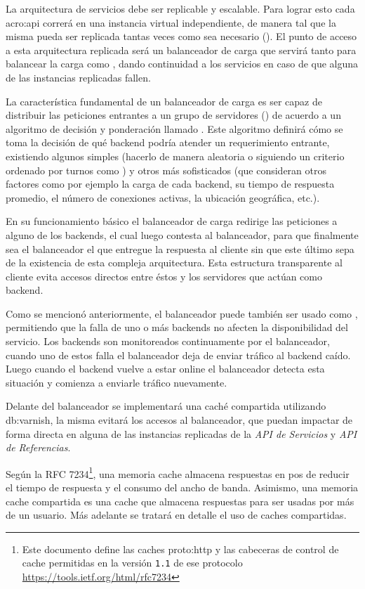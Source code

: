 La arquitectura de servicios debe ser replicable y escalable. Para lograr esto cada \gls{acro:api} correrá en una instancia virtual independiente, de manera tal que la misma pueda ser replicada tantas veces como sea necesario (). El punto de acceso a esta arquitectura replicada será un balanceador de carga que servirá tanto para balancear la carga como , dando continuidad a los servicios en caso de que alguna de las instancias replicadas fallen.

La característica fundamental de un balanceador de carga es ser capaz de distribuir las peticiones entrantes a un grupo de servidores () de acuerdo a un algoritmo de decisión y ponderación llamado . Este algoritmo definirá cómo se toma la decisión de qué backend podría atender un requerimiento entrante, existiendo algunos simples (hacerlo de manera aleatoria o siguiendo un criterio ordenado por turnos como ) y otros más sofisticados (que consideran otros factores como por ejemplo la carga de cada backend, su tiempo de respuesta promedio, el número de conexiones activas, la ubicación geográfica, etc.).

En su funcionamiento básico el balanceador de carga redirige las peticiones a alguno de los backends, el cual luego contesta al balanceador, para que finalmente sea el balanceador el que entregue la respuesta al cliente sin que este último sepa de la existencia de esta compleja arquitectura. Esta estructura transparente al cliente evita accesos directos entre éstos y los servidores que actúan como backend.

Como se mencionó anteriormente, el balanceador puede también ser usado como , permitiendo que la falla de uno o más backends no afecten la disponibilidad del servicio. Los backends son monitoreados continuamente por el balanceador, cuando uno de estos falla el balanceador deja de enviar tráfico al backend caído. Luego cuando el backend vuelve a estar online el balanceador detecta esta situación y comienza a enviarle tráfico nuevamente.

Delante del balanceador se implementará una caché compartida utilizando \gls{db:varnish}, la misma evitará los accesos al balanceador, que puedan impactar de forma directa en alguna de las instancias replicadas de la \textit{API de Servicios} y \textit{API de Referencias}.

Según la RFC 7234\footnote{Este documento define las caches \gls{proto:http} y las cabeceras de control de cache permitidas en la versión \texttt{1.1} de ese protocolo\\\url{https://tools.ietf.org/html/rfc7234}}, una memoria cache almacena respuestas en pos de reducir el tiempo de respuesta y el consumo del ancho de banda. Asimismo, una memoria cache compartida es una cache que almacena respuestas para ser usadas por más de un usuario. Más adelante se tratará en detalle el uso de caches compartidas.

